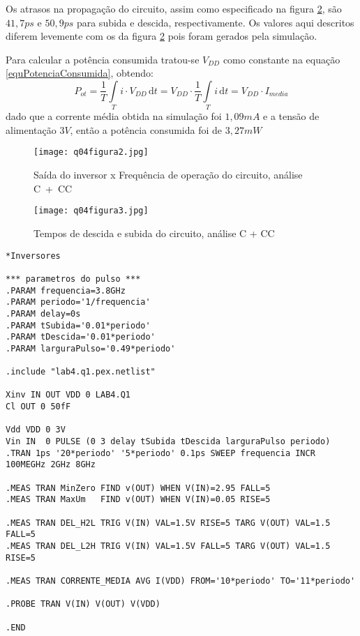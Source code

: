 \documentclass[10pt, a4paper, titlepage]{article}
\newcommand{\defaultfigwidth}[0]{10cm}
\begin{document}
Os atrasos na propagação do circuito, assim como especificado na figura \ref{figAtrasoQ4}, são $41,7ps$ e $50,9ps$ para subida e descida, respectivamente. Os valores aqui descritos diferem levemente com os da figura \ref{figAtrasoQ4} pois foram gerados pela simulação.

Para calcular a potência consumida tratou-se $V_{DD}$ como constante na equação \ref{equPotenciaConsumida}, obtendo:
\begin{equation}
P_{ot} = \frac{1}{T} \int\limits_T i \cdot V_{DD} \, \mathrm{d}t = V_{DD} \cdot \frac{1}{T} \int\limits_T i \, \mathrm{d}t = V_{DD} \cdot I_{media}
\end{equation}
dado que a corrente média obtida na simulação foi $1,09mA$ e a tensão de alimentação $3V$, então a potência consumida foi de $3,27mW$

\begin{figure}[!hb]
    \centering
    \texttt{[image: q04figura2.jpg]}
    \caption{Saída do inversor x Frequência de operação do circuito, análise C~+~CC}
    \label{figFreqQ4}
\end{figure}

\begin{figure}[!hb]
    \centering
    \texttt{[image: q04figura3.jpg]}
    \caption{Tempos de descida e subida do circuito, análise C + CC}
    \label{figAtrasoQ4}
\end{figure}

\begin{lstlisting}[caption=Inversor com análise para definir a máxima frequência de operação\, análise C + CC, label=cod_inversores_q4]
*Inversores

*** parametros do pulso ***
.PARAM frequencia=3.8GHz
.PARAM periodo='1/frequencia'
.PARAM delay=0s
.PARAM tSubida='0.01*periodo'
.PARAM tDescida='0.01*periodo'
.PARAM larguraPulso='0.49*periodo'

.include "lab4.q1.pex.netlist"

Xinv IN OUT VDD 0 LAB4.Q1
Cl OUT 0 50fF

Vdd VDD 0 3V
Vin IN  0 PULSE (0 3 delay tSubida tDescida larguraPulso periodo)
.TRAN 1ps '20*periodo' '5*periodo' 0.1ps SWEEP frequencia INCR 100MEGHz 2GHz 8GHz

.MEAS TRAN MinZero FIND v(OUT) WHEN V(IN)=2.95 FALL=5
.MEAS TRAN MaxUm   FIND v(OUT) WHEN V(IN)=0.05 RISE=5

.MEAS TRAN DEL_H2L TRIG V(IN) VAL=1.5V RISE=5 TARG V(OUT) VAL=1.5 FALL=5
.MEAS TRAN DEL_L2H TRIG V(IN) VAL=1.5V FALL=5 TARG V(OUT) VAL=1.5 RISE=5

.MEAS TRAN CORRENTE_MEDIA AVG I(VDD) FROM='10*periodo' TO='11*periodo'

.PROBE TRAN V(IN) V(OUT) V(VDD)

.END
\end{lstlisting}
\end{document}
